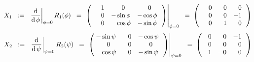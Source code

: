 \vskip 0.5cm
\begin{equation*}
X_{1}
\;\; := \;\;
	\left.\dfrac{\d}{\d\,\phi}\right\vert_{\phi = 0} R_{1}(\phi)
\;\; = \;
	\left.\left(\,
		\begin{array}{ccc}
			{\color{white}-}1 & {\color{white}-}0 & {\color{white}-}0 \\
			{\color{white}-}0 & {\color{black}-}\sin\phi & {\color{black}-}\cos\phi \\
			{\color{white}-}0 & {\color{white}-}\cos\phi & {\color{black}-}\sin\phi \\
			\end{array}
		\,\right)\right\vert_{\phi = 0}
\;\; = \;
	\left(\,
		\begin{array}{ccc}
			{\color{white}-}0 & {\color{white}-}0 & {\color{white}-}0 \\
			{\color{white}-}0 & {\color{white}-}0 & {\color{black}-}1 \\
			{\color{white}-}0 & {\color{white}-}1 & {\color{white}-}0 \\
			\end{array}
		\,\right)
\end{equation*}
\begin{equation*}
X_{2}
\;\; := \;\;
	\left.\dfrac{\d}{\d\,\psi}\right\vert_{\psi = 0} R_{2}(\psi)
\;\; = \;
	\left.\left(\!\!
		\begin{array}{ccc}
			{\color{black}-}\sin\psi & {\color{white}-}0 & {\color{black}-}\cos\psi \\
			{\color{white}-}0 & {\color{white}-}0 & {\color{white}-}0 \\
			{\color{white}-}\cos\psi & {\color{white}-}0 & {\color{black}-}\sin\psi \\
			\end{array}
		\,\right)\right\vert_{\psi = 0}
\;\; = \;
	\left(\!\!
		\begin{array}{ccc}
			{\color{white}-}0 & {\color{white}-}0 & {\color{black}-}1 \\
			{\color{white}-}0 & {\color{white}-}0 & {\color{white}-}0 \\
			{\color{white}-}1 & {\color{white}-}0 & {\color{white}-}0 \\
			\end{array}
		\,\right)
\end{equation*}
